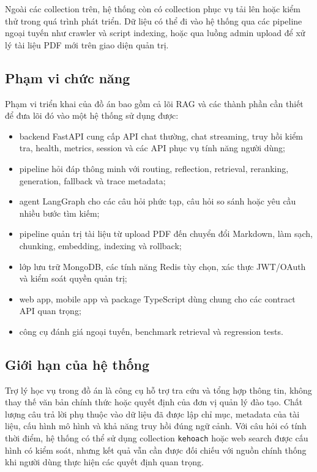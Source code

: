 \documentclass[../DoAn.tex]{subfiles}
\begin{document}
Ngoài các collection trên, hệ thống còn có collection phục vụ tải lên hoặc kiểm
thử trong quá trình phát triển. Dữ liệu có thể đi vào hệ thống qua các pipeline
ngoại tuyến như crawler và script indexing, hoặc qua luồng admin upload để xử lý
tài liệu PDF mới trên giao diện quản trị.

\subsection{Phạm vi chức năng}

Phạm vi triển khai của đồ án bao gồm cả lõi RAG và các thành phần cần thiết để
đưa lõi đó vào một hệ thống sử dụng được:

\begin{itemize}
    \item backend FastAPI cung cấp API chat thường, chat streaming, truy hồi
    kiểm tra, health, metrics, session và các API phục vụ tính năng người dùng;
    \item pipeline hỏi đáp thông minh với routing, reflection, retrieval,
    reranking, generation, fallback và trace metadata;
    \item agent LangGraph cho các câu hỏi phức tạp, câu hỏi so sánh hoặc yêu cầu
    nhiều bước tìm kiếm;
    \item pipeline quản trị tài liệu từ upload PDF đến chuyển đổi Markdown, làm
    sạch, chunking, embedding, indexing và rollback;
    \item lớp lưu trữ MongoDB, các tính năng Redis tùy chọn, xác thực JWT/OAuth
    và kiểm soát quyền quản trị;
    \item web app, mobile app và package TypeScript dùng chung cho các contract
    API quan trọng;
    \item công cụ đánh giá ngoại tuyến, benchmark retrieval và regression tests.
\end{itemize}

\subsection{Giới hạn của hệ thống}

Trợ lý học vụ trong đồ án là công cụ hỗ trợ tra cứu và tổng hợp thông tin, không
thay thế văn bản chính thức hoặc quyết định của đơn vị quản lý đào tạo. Chất
lượng câu trả lời phụ thuộc vào dữ liệu đã được lập chỉ mục, metadata của tài
liệu, cấu hình mô hình và khả năng truy hồi đúng ngữ cảnh. Với câu hỏi có tính
thời điểm, hệ thống có thể sử dụng collection \texttt{kehoach} hoặc web search
được cấu hình có kiểm soát, nhưng kết quả vẫn cần được đối chiếu với nguồn chính
thống khi người dùng thực hiện các quyết định quan trọng.
\end{document}
